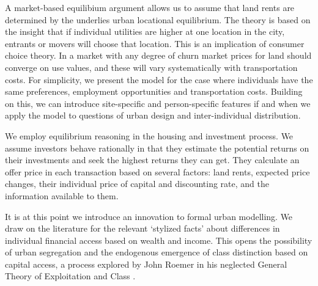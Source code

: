 




A market-based equilibium argument allows us to assume that land rents are determined by the underlies urban locational equilibrium. The theory is based on the insight that if individual utilities are higher at one location in the city, entrants or movers will choose that location. This is an implication of consumer choice theory. In a market with any degree of churn market prices for land should converge on use values, and these will vary systematically with transportation costs. For simplicity, we present the model for the case where individuals have the same preferences, employment opportunities and transportation costs. Building on this, 
we can introduce site-specific and person-specific features if and when we apply the model to questions of urban design and inter-individual distribution. 




We employ \gls{equilibrium reasoning} in the housing and investment process. We assume investors behave rationally in that they estimate the potential returns on their investments and seek the highest returns they can get. They calculate an offer price in each transaction based on several factors: land rents, expected price changes, their individual price of capital and discounting rate, and the information available to them. 

It is at this point we introduce an innovation to formal urban modelling. We draw on the literature for the relevant `\gls{stylized facts}' about differences in individual financial access based on wealth and income. This opens the possibility of urban segregation and the endogenous emergence of \gls{class} distinction based on capital access, a process explored by John Roemer in his neglected General Theory of Exploitation and Class \cite{roemerGeneralTheoryExploitation1982}.  

